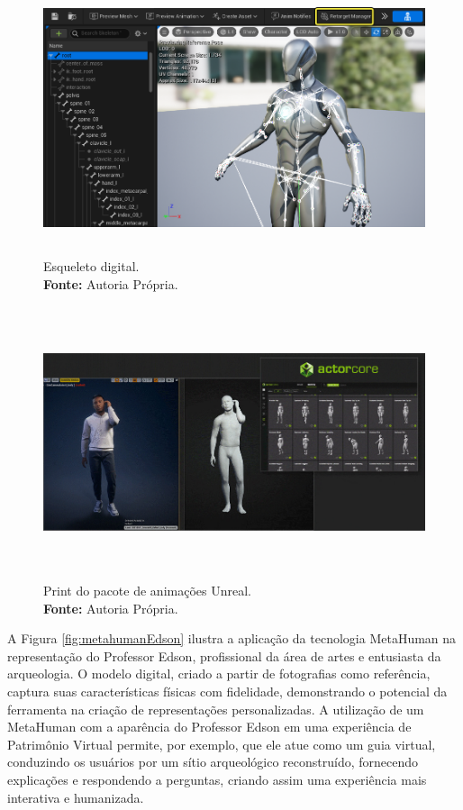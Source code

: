 \begin{figure}[H]
    \centering
    \includegraphics[height=8cm, keepaspectratio]{img/skeleton.png}
    \caption{Esqueleto digital.\\
        \textbf{Fonte:} Autoria Própria.}
    \label{fig:skeleton}
\end{figure}

\begin{figure}[H]
    \centering
    \includegraphics[height=8cm, keepaspectratio]{gif/animacoes/feature_body_motion-0000.jpg}
    \caption{ Print do pacote de animações Unreal.\\
        \textbf{Fonte:} Autoria Própria.}
    \label{fig:animacoes}
\end{figure}


A Figura \ref{fig:metahumanEdson} ilustra a aplicação da tecnologia MetaHuman na representação do Professor Edson, profissional da área de artes e entusiasta da arqueologia. O modelo digital, criado a partir de fotografias como referência, captura suas características físicas com fidelidade, demonstrando o potencial da ferramenta na criação de representações personalizadas. A utilização de um MetaHuman com a aparência do Professor Edson em uma experiência de Patrimônio Virtual permite, por exemplo, que ele atue como um guia virtual, conduzindo os usuários por um sítio arqueológico reconstruído, fornecendo explicações e respondendo a perguntas, criando assim uma experiência mais interativa e humanizada.

